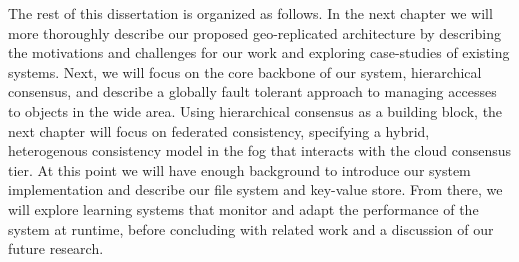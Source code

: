 The rest of this dissertation is organized as follows.
In the next chapter we will more thoroughly describe our proposed geo-replicated architecture by describing the motivations and challenges for our work and exploring case-studies of existing systems.
Next, we will focus on the core backbone of our system, hierarchical consensus, and describe a globally fault tolerant approach to managing accesses to objects in the wide area.
Using hierarchical consensus as a building block, the next chapter will focus on federated consistency, specifying a hybrid, heterogenous consistency model in the fog that interacts with the cloud consensus tier.
At this point we will have enough background to introduce our system implementation and describe our file system and key-value store.
From there, we will explore learning systems that monitor and adapt the performance of the system at runtime, before concluding with related work and a discussion of our future research.
